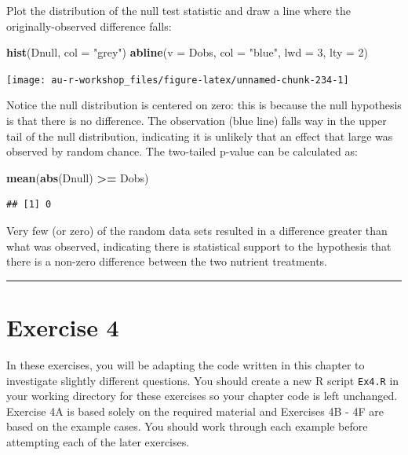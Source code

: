 \documentclass[]{book}
\newenvironment{Shaded}{\begin{snugshade}}{\end{snugshade}}
\newcommand{\DataTypeTok}[1]{\textcolor[rgb]{0.13,0.29,0.53}{#1}}
\newcommand{\DecValTok}[1]{\textcolor[rgb]{0.00,0.00,0.81}{#1}}
\newcommand{\KeywordTok}[1]{\textcolor[rgb]{0.13,0.29,0.53}{\textbf{#1}}}
\newcommand{\NormalTok}[1]{#1}
\newcommand{\OperatorTok}[1]{\textcolor[rgb]{0.81,0.36,0.00}{\textbf{#1}}}
\newcommand{\StringTok}[1]{\textcolor[rgb]{0.31,0.60,0.02}{#1}}
\begin{document}
Plot the distribution of the null test statistic and draw a line where the originally-observed difference falls:

\begin{Shaded}
\begin{Highlighting}[]
\KeywordTok{hist}\NormalTok{(Dnull, }\DataTypeTok{col =} \StringTok{"grey"}\NormalTok{)}
\KeywordTok{abline}\NormalTok{(}\DataTypeTok{v =}\NormalTok{ Dobs, }\DataTypeTok{col =} \StringTok{"blue"}\NormalTok{, }\DataTypeTok{lwd =} \DecValTok{3}\NormalTok{, }\DataTypeTok{lty =} \DecValTok{2}\NormalTok{)}
\end{Highlighting}
\end{Shaded}

\begin{center}\texttt{[image: au-r-workshop\_files/figure-latex/unnamed-chunk-234-1]} \end{center}

Notice the null distribution is centered on zero: this is because the null hypothesis is that there is no difference. The observation (blue line) falls way in the upper tail of the null distribution, indicating it is unlikely that an effect that large was observed by random chance. The two-tailed p-value can be calculated as:

\begin{Shaded}
\begin{Highlighting}[]
\KeywordTok{mean}\NormalTok{(}\KeywordTok{abs}\NormalTok{(Dnull) }\OperatorTok{>=}\StringTok{ }\NormalTok{Dobs)}
\end{Highlighting}
\end{Shaded}

\begin{verbatim}
## [1] 0
\end{verbatim}

Very few (or zero) of the random data sets resulted in a difference greater than what was observed, indicating there is statistical support to the hypothesis that there is a non-zero difference between the two nutrient treatments.

\begin{center}\rule{0.5\linewidth}{\linethickness}\end{center}

\hypertarget{exercise-4}{%
\section{Exercise 4}\label{exercise-4}}

In these exercises, you will be adapting the code written in this chapter to investigate slightly different questions. You should create a new R script \texttt{Ex4.R} in your working directory for these exercises so your chapter code is left unchanged. Exercise 4A is based solely on the required material and Exercises 4B - 4F are based on the example cases. You should work through each example before attempting each of the later exercises.
\end{document}
